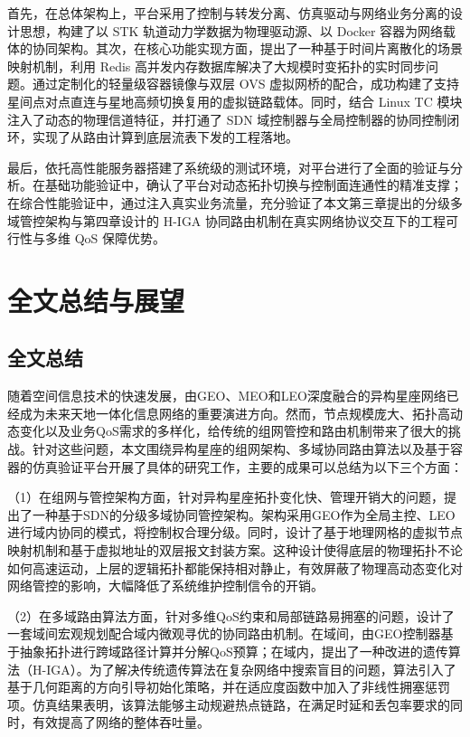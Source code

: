 \documentclass[print, master, vlined]{DissertUESTC}
\begin{document}
    首先，在总体架构上，平台采用了控制与转发分离、仿真驱动与网络业务分离的设计思想，构建了以 STK 轨道动力学数据为物理驱动源、以 Docker 容器为网络载体的协同架构。其次，在核心功能实现方面，提出了一种基于时间片离散化的场景映射机制，利用 Redis 高并发内存数据库解决了大规模时变拓扑的实时同步问题。通过定制化的轻量级容器镜像与双层 OVS 虚拟网桥的配合，成功构建了支持星间点对点直连与星地高频切换复用的虚拟链路载体。同时，结合 Linux TC 模块注入了动态的物理信道特征，并打通了 SDN 域控制器与全局控制器的协同控制闭环，实现了从路由计算到底层流表下发的工程落地。

    最后，依托高性能服务器搭建了系统级的测试环境，对平台进行了全面的验证与分析。在基础功能验证中，确认了平台对动态拓扑切换与控制面连通性的精准支撑；在综合性能验证中，通过注入真实业务流量，充分验证了本文第三章提出的分级多域管控架构与第四章设计的 H-IGA 协同路由机制在真实网络协议交互下的工程可行性与多维 QoS 保障优势。
    
    \chapter{全文总结与展望}
    \section{全文总结}
    随着空间信息技术的快速发展，由GEO、MEO和LEO深度融合的异构星座网络已经成为未来天地一体化信息网络的重要演进方向。然而，节点规模庞大、拓扑高动态变化以及业务QoS需求的多样化，给传统的组网管控和路由机制带来了很大的挑战。针对这些问题，本文围绕异构星座的组网架构、多域协同路由算法以及基于容器的仿真验证平台开展了具体的研究工作，主要的成果可以总结为以下三个方面：

    （1）在组网与管控架构方面，针对异构星座拓扑变化快、管理开销大的问题，提出了一种基于SDN的分级多域协同管控架构。架构采用GEO作为全局主控、LEO进行域内协同的模式，将控制权合理分级。同时，设计了基于地理网格的虚拟节点映射机制和基于虚拟地址的双层报文封装方案。这种设计使得底层的物理拓扑不论如何高速运动，上层的逻辑拓扑都能保持相对静止，有效屏蔽了物理高动态变化对网络管控的影响，大幅降低了系统维护控制信令的开销。
    
    （2）在多域路由算法方面，针对多维QoS约束和局部链路易拥塞的问题，设计了一套域间宏观规划配合域内微观寻优的协同路由机制。在域间，由GEO控制器基于抽象拓扑进行跨域路径计算并分解QoS预算；在域内，提出了一种改进的遗传算法（H-IGA）。为了解决传统遗传算法在复杂网络中搜索盲目的问题，算法引入了基于几何距离的方向引导初始化策略，并在适应度函数中加入了非线性拥塞惩罚项。仿真结果表明，该算法能够主动规避热点链路，在满足时延和丢包率要求的同时，有效提高了网络的整体吞吐量。
\end{document}
